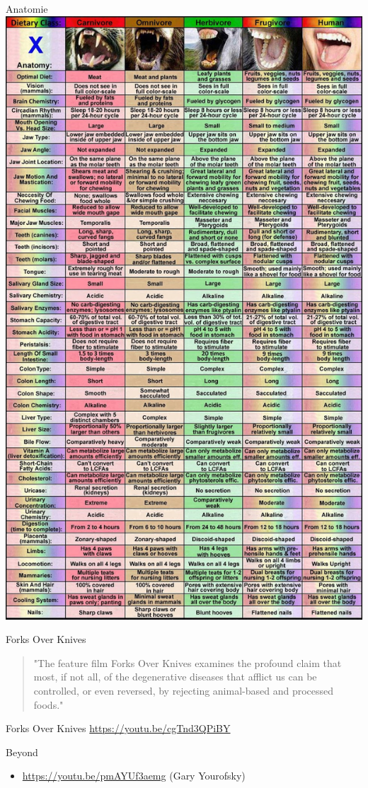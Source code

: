 \documentclass[presentation]{beamer}
\begin{document}
\begin{frame}[label=sec-4-1]{Anatomie}
\includegraphics[width=.9\linewidth]{../images/anatomy.jpeg}
\end{frame}

\begin{frame}[label=sec-4-2]{Forks Over Knives}
\begin{quotation}
"The feature film Forks Over Knives examines the profound claim that most, if not all, of the degenerative diseases that afflict us can be controlled, or even reversed, by rejecting animal-based and processed foods."
\end{quotation}

\begin{alertblock}{Forks Over Knives}
\url{https://youtu.be/cgTnd3QPiBY}
\end{alertblock}
\end{frame}

\begin{frame}[label=sec-4-3]{Beyond}
\begin{itemize}
\item \url{https://youtu.be/pmAYUf3aemg} (Gary Yourofsky)
\end{itemize}
\end{frame}
\end{document}
